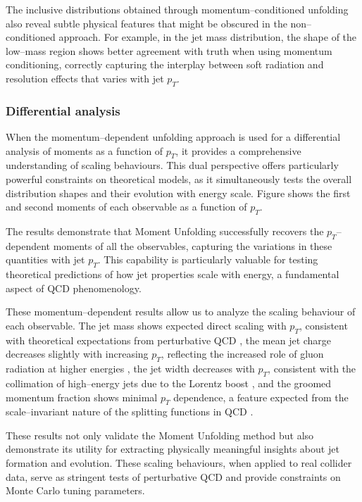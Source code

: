             The inclusive distributions obtained through momentum--conditioned unfolding also reveal subtle physical features that might be obscured in the non--conditioned approach.
            For example, in the jet mass distribution, the shape of the low--mass region shows better agreement with truth when using momentum conditioning, correctly capturing the interplay between soft radiation and resolution effects that varies with jet \(p_T\).
        \subsubsection{Differential analysis}
            When the momentum--dependent unfolding approach is used for a differential analysis of moments as a function of \(p_T\), it provides a comprehensive understanding of scaling behaviours.
            This dual perspective offers particularly powerful constraints on theoretical models, as it simultaneously tests the overall distribution shapes and their evolution with energy scale.
            Figure  shows the first and second moments of each observable as a function of $p_T$.

            The results demonstrate that Moment Unfolding successfully recovers the $p_T$--dependent moments of all the observables, capturing the variations in these quantities with jet \(p_T\).
            This capability is particularly valuable for testing theoretical predictions of how jet properties scale with energy, a fundamental aspect of QCD phenomenology.

            These momentum--dependent results allow us to analyze the scaling behaviour of each observable.
            The jet mass shows expected direct scaling with $p_T$, consistent with theoretical expectations from perturbative QCD ,
            the mean jet charge decreases slightly with increasing $p_T$, reflecting the increased role of gluon radiation at higher energies ,
            the jet width decreases with $p_T$, consistent with the collimation of high--energy jets due to the Lorentz boost , and
            the groomed momentum fraction shows minimal $p_T$ dependence, a feature expected from the scale--invariant nature of the splitting functions in QCD .

            These results not only validate the Moment Unfolding method but also demonstrate its utility for extracting physically meaningful insights about jet formation and evolution.
            These scaling behaviours, when applied to real collider data, serve as stringent tests of perturbative QCD and provide constraints on Monte Carlo tuning parameters.
